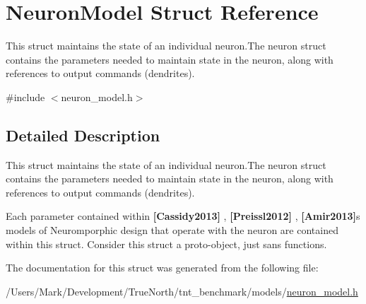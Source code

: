 \hypertarget{struct_neuron_model}{}\section{Neuron\+Model Struct Reference}
\label{struct_neuron_model}


This struct maintains the state of an individual neuron.\+The neuron struct contains the parameters needed to maintain state in the neuron, along with references to output commands (dendrites).  




{\ttfamily \#include $<$neuron\+\_\+model.\+h$>$}



\subsection{Detailed Description}
This struct maintains the state of an individual neuron.\+The neuron struct contains the parameters needed to maintain state in the neuron, along with references to output commands (dendrites). 

Each parameter contained within {\bfseries [Cassidy2013]} , {\bfseries [Preissl2012]} , {\bfseries [Amir2013]}\textquotesingle{}s models of Neuromporphic design that operate with the neuron are contained within this struct. Consider this struct a proto-\/object, just sans functions. 

The documentation for this struct was generated from the following file\+:\begin{DoxyCompactItemize}
\item 
/\+Users/\+Mark/\+Development/\+True\+North/tnt\+\_\+benchmark/models/\hyperlink{neuron__model_8h}{neuron\+\_\+model.\+h}\end{DoxyCompactItemize}
